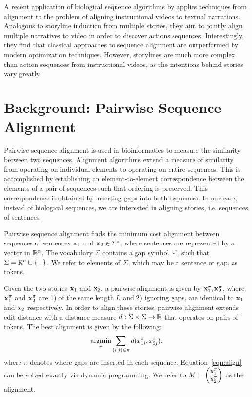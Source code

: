 \documentclass{article}
\begin{document}
A recent application of biological sequence algorithms
by \citet{alayrac2015align} applies techniques from alignment
to the problem of aligning instructional videos to textual narrations.
Analogous to storyline induction from multiple stories,
they aim to jointly align multiple narratives to video
in order to discover actions sequences.
Interestingly, they find that classical approaches
to sequence alignment are outperformed by modern optimization techniques.
However, storylines are much more complex than action sequences from instructional videos,
as the intentions behind stories vary greatly.

\section{Background: Pairwise Sequence Alignment}
Pairwise sequence alignment is used in bioinformatics to measure the similarity between
two sequences.
Alignment algorithms extend a measure of similarity from operating on individual elements
to operating on entire sequences.
This is accomplished by establishing an element-to-element correspondence between 
the elements of a pair of sequences such that ordering is preserved.
This correspondence is obtained by inserting gaps into both sequences.
In our case, instead of biological sequences, we are interested in aligning stories,
i.e. sequences of sentences.

Pairwise sequence alignment finds the minimum cost alignment
between sequences of sentences $\mathbf{x}_1$ and $\mathbf{x}_2\in\Sigma^*$,
where sentences are represented by a vector in $\mathbb{R}^n$.
The vocabulary $\Sigma$ contains a gap symbol `-', such that $\Sigma = \mathbb{R}^n \cup \left\{-\right\}$.
We refer to elements of $\Sigma$, which may be a sentence or gap, as tokens.

Given the two stories $\mathbf{x}_1$ and $\mathbf{x}_2$, a pairwise alignment is given by $\mathbf{x}_1^\pi, \mathbf{x}_2^\pi$,
where $\mathbf{x}_1^\pi$ and $\mathbf{x}_2^\pi$ are 1) of the same length $L$ and 2) ignoring gaps,
are identical to $\mathbf{x}_1$ and $\mathbf{x}_2$ respectively.
In order to align these stories, pairwise alignment extends edit distance
with a distance measure $d: \Sigma\times\Sigma\to\mathbb{R}$ that operates on pairs of tokens.
The best alignment is given by the following:
\begin{equation}
\label{eqn:align}
\operatorname*{argmin}_\pi \sum_{(i, j) \in \pi} d(x_{1i}^\pi,x_{2j}^\pi),
\end{equation}
where $\pi$ denotes where gaps are inserted in each sequence.
Equation~\ref{eqn:align} can be solved exactly via dynamic programming.
We refer to 
$M = \begin{pmatrix}\mathbf{x}^\pi_1 \\ \mathbf{x}^\pi_2 \end{pmatrix}$
as the alignment.
\end{document}

